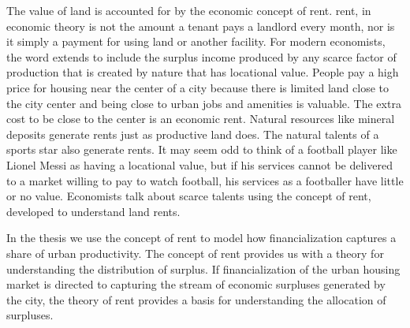 The value of land is accounted for by the economic concept of rent. \Gls{rent}, in economic theory is not the amount a tenant pays a landlord every month, nor is it simply a payment for using land or another facility. %
For modern economists, the word extends to include the \gls{surplus} income produced by any scarce factor of production that is created by nature that has locational value. People pay a high price for housing near the center of a city because there is limited %
land close to the city center and being close to urban jobs and amenities is valuable. The extra cost to be close to the center is an \gls{economic rent}. %
Natural resources like mineral deposits generate rents just as productive land does.  %
The natural talents of a sports star also generate rents. %
It may seem odd to think of a football player like Lionel Messi as having a locational value, but if his services cannot be delivered to a market willing to pay to watch football, his services as a footballer have little or no value. Economists talk about scarce talents using the concept of rent, developed to understand land rents.  

In the thesis we use the concept of rent to model how financialization captures a share of urban productivity. %
The concept of rent provides us with a theory for understanding the distribution of surplus.  If financialization of the urban housing market is directed to capturing the stream of economic surpluses generated by the city, %
the theory of rent provides a basis for understanding the allocation of surpluses.


